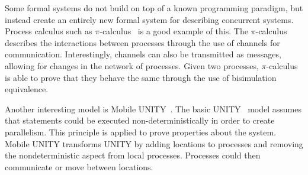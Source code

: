 Some formal systems do not build on top of a known programming paradigm, but instead
create an entirely new formal system for describing concurrent systems. Process calculus
such as $\pi$-calculus~\cite{Milner:1999:CMS:329902} is a good example of this.
The $\pi$-calculus describes the interactions between processes
through the use of channels for communication. Interestingly, channels can also be transmitted as
messages, allowing for changes in the network of processes.
Given two processes, $\pi$-calculus is able to prove that they behave the same through
the use of bisimulation equivalence.

Another interesting model is Mobile UNITY~\cite{Roman97anintroduction}. The basic UNITY~\cite{UNITY} model assumes that statements could be executed non-deterministically
in order to create parallelism. This principle is applied to prove properties about
the system.
Mobile UNITY transforms UNITY by adding locations to processes and removing the
nondeterministic aspect from local processes. Processes could then communicate or move
between locations.
\begin{comment}
Because \lang also uses locations (as nodes),
we believe that it may be possible to express \lang programs in Mobile UNITY but
we haven't look deeply into it.
\end{comment}
